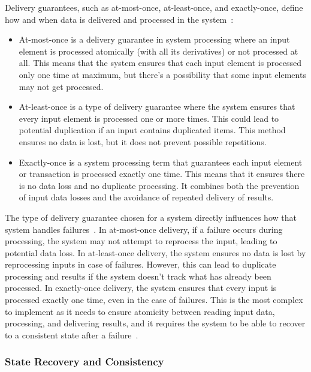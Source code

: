 Delivery guarantees, such as at-most-once, at-least-once, and exactly-once, define how and when data is delivered and processed in the system~\cite{fragkoulis2024survey, carbone2018scalable, Akidau:2013:MFS:2536222.2536229}:
\begin{itemize}
    \item At-most-once is a delivery guarantee in system processing where an input element is processed atomically (with all its derivatives) or not processed at all. This means that the system ensures that each input element is processed only one time at maximum, but there's a possibility that some input elements may not get processed.
    \item At-least-once is a type of delivery guarantee where the system ensures that every input element is processed one or more times. This could lead to potential duplication if an input contains duplicated items. This method ensures no data is lost, but it does not prevent possible repetitions.
    \item Exactly-once is a system processing term that guarantees each input element or transaction is processed exactly one time. This means that it ensures there is no data loss and no duplicate processing. It combines both the prevention of input data losses and the avoidance of repeated delivery of results.
\end{itemize}

The type of delivery guarantee chosen for a system directly influences how that system handles failures~\cite{zhang2024survey, silvestre2021clonos, wang2021consistency}. In at-most-once delivery, if a failure occurs during processing, the system may not attempt to reprocess the input, leading to potential data loss. In at-least-once delivery, the system ensures no data is lost by reprocessing inputs in case of failures. However, this can lead to duplicate processing and results if the system doesn't track what has already been processed. In exactly-once delivery, the system ensures that every input is processed exactly one time, even in the case of failures. This is the most complex to implement as it needs to ensure atomicity between reading input data, processing, and delivering results, and it requires the system to be able to recover to a consistent state after a failure~\cite{Carbone:2017:SMA:3137765.3137777}.

\subsubsection{State Recovery and Consistency}

